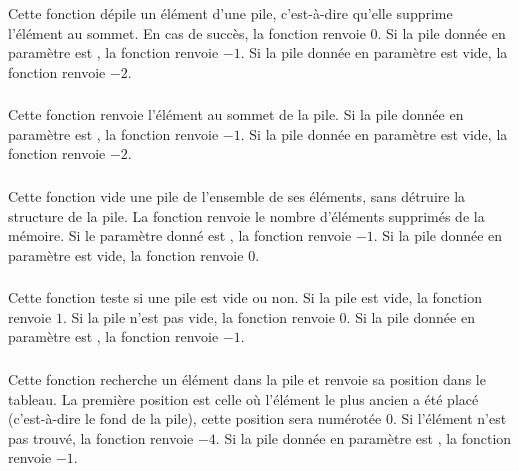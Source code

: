 \noindent Cette fonction dépile un élément d'une pile, c'est-à-dire qu'elle supprime l'élément au sommet.
En cas de succès, la fonction renvoie $ 0 $.
Si la pile donnée en paramètre est , la fonction renvoie $ -1 $.
Si la pile donnée en paramètre est vide, la fonction renvoie $ -2 $.


\subsubsection*{}

\noindent Cette fonction renvoie l'élément au sommet de la pile.
Si la pile donnée en paramètre est , la fonction renvoie $ -1 $.
Si la pile donnée en paramètre est vide, la fonction renvoie $ -2 $.


\subsubsection*{}

\noindent Cette fonction vide une pile de l'ensemble de ses éléments, sans détruire la structure de la pile.
La fonction renvoie le nombre d'éléments supprimés de la mémoire.
Si le paramètre donné est , la fonction renvoie $ -1 $.
Si la pile donnée en paramètre est vide, la fonction renvoie $ 0 $.


\subsubsection*{}

\noindent Cette fonction teste si une pile est vide ou non.
Si la pile est vide, la fonction renvoie $ 1 $.
Si la pile n'est pas vide, la fonction renvoie $ 0 $.
Si la pile donnée en paramètre est , la fonction renvoie $ -1 $.


\subsubsection*{}

\noindent Cette fonction recherche un élément dans la pile et renvoie sa position dans le tableau.
La première position est celle où l'élément le plus ancien a été placé (c'est-à-dire le fond de la pile), cette position sera numérotée $ 0 $.
Si l'élément n'est pas trouvé, la fonction renvoie $ -4 $.
Si la pile donnée en paramètre est , la fonction renvoie $ -1 $.


